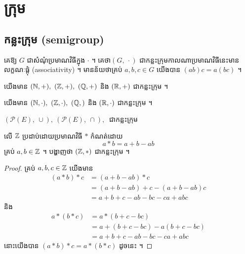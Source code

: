 \section{ក្រុម}
\subsection{កន្លះក្រុម (semigroup)}
\begin{definition}
គេឱ្យ $G$ ជាសំណុំប្រមាណវិធីក្នុង $\cdot$ ។ គេថា​ $(G,~\cdot)$ 
ជាកន្លះក្រុមកាលណាប្រមាណវិធីនេះមានលក្ខណៈផ្តុំ (associativity) ។ មានន័យថាគ្រប់
$a,b,c\in G$ យើងបាន $(ab)c=a(bc)$ ។
\end{definition}

\begin{example}
យើងមាន $(\mathbb{N},+),~(\mathbb{Z},+),~(\mathbb{Q},+)$ និង $(\mathbb{R},+)$ ជាកន្លះក្រុម ។
\end{example}
\begin{example}
យើងមាន $(\mathbb{N},\cdot),~(\mathbb{Z},\cdot),~(\mathbb{Q},)$ និង $(\mathbb{R},\cdot)$ ជាកន្លះក្រុម ។
\end{example}
\begin{example}
$(\mathcal{P}(E),~\cup),~(\mathcal{P}(E),~\cap),~$ ជាកន្លះក្រុម
\end{example}

\newpage
\begin{example}
លើ $\mathbb{Z}$ ប្រដាប់ដោយប្រមាណវិធី $\ast$ កំណត់ដោយ
\[a\ast b=a+b-ab\]
គ្រប់ $a,b\in\mathbb{Z}$ ។ បង្ហាញថា $(\mathbb{Z},\ast)$ ជាកន្លះក្រុម ។
\end{example}
\begin{proof}
គ្រប់ $a,b,c\in\mathbb{Z}$ យើងមាន
\begin{align*}
(a\ast b)\ast c&=(a+b-ab)\ast c\\
&=(a+b-ab)+c-(a+b-ab)c\\
&=a+b+c-ab-bc-ca+abc
\end{align*}
និង
\begin{align*}
a\ast (b\ast c)&=a\ast (b+c-bc)\\
&=a+(b+c-bc) -a(b+c-bc)\\
&=a+b+c-ab-bc-ca+abc
\end{align*}
នោះយើងបាន $(a\ast b)\ast c=a\ast (b\ast c)$ ដូចនេះ
 ។
\end{proof}


